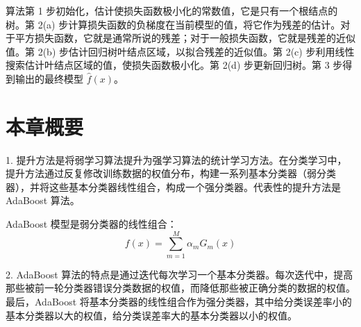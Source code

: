 \documentclass[UTF8, 12pt, fontset=fandol, oneside]{ctexart}
\begin{document}
\begin{center}
\end{center}

算法第 1 步初始化，估计使损失函数极小化的常数值，它是只有一个根结点的树。第 2(a) 步计算损失函数的负梯度在当前模型的值，将它作为残差的估计。对于平方损失函数，它就是通常所说的残差；对于一般损失函数，它就是残差的近似值。第 2(b) 步估计回归树叶结点区域，以拟合残差的近似值。第 2(c) 步利用线性搜索估计叶结点区域的值，使损失函数极小化。第 2(d) 步更新回归树。第 3 步得到输出的最终模型 $\hat{f}(x)$。

\section*{本章概要}

1. 提升方法是将弱学习算法提升为强学习算法的统计学习方法。在分类学习中，提升方法通过反复修改训练数据的权值分布，构建一系列基本分类器（弱分类器），并将这些基本分类器线性组合，构成一个强分类器。代表性的提升方法是 AdaBoost 算法。

AdaBoost 模型是弱分类器的线性组合：
\[
f(x)=\sum_{m=1}^M \alpha_mG_m(x)
\]

2. AdaBoost 算法的特点是通过迭代每次学习一个基本分类器。每次迭代中，提高那些被前一轮分类器错误分类数据的权值，而降低那些被正确分类的数据的权值。最后，AdaBoost 将基本分类器的线性组合作为强分类器，其中给分类误差率小的基本分类器以大的权值，给分类误差率大的基本分类器以小的权值。
\end{document}
